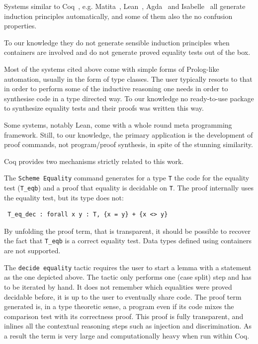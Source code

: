 \documentclass[sigplan,10pt,review]{acmart}\settopmatter{printfolios=true,printccs=false,printacmref=false}
\begin{document}
Systems similar to Coq~\cite{the_coq_development_team_2018_1219885},
e.g. Matita~\cite{10.1007/978-3-642-22438-6_7},
Lean~\cite{10.1007/978-3-319-21401-6_26}, Agda~\cite{norell:thesis} and
Isabelle~\cite{Nipkow:2002:IPA:1791547} all generate
induction principles automatically, and some of them also the
no confusion properties. 

To our knowledge they do not generate sensible induction principles
when containers are involved and do not generate proved equality tests
out of the box.

Most of the systems cited above come with simple forms of Prolog-like
automation, usually in the form of type classes. The user typically
resorts to that in order to perform some of the inductive reasoning
one needs in order to synthesise code in a type directed way.
To our knowledge no ready-to-use package to synthesize equality tests
and their proofs was written this way.

Some systems, notably Lean, come with a whole round meta programming 
framework. Still, to our knowledge, the primary application is the
development of proof commands, not program/proof synthesis, in spite
of the stunning similarity.

Coq provides two mechanisms strictly related to this work.

The \lstinline+Scheme Equality+ command generates for a type
\lstinline+T+ the code for the equality test (\lstinline+T_eqb+) 
and a proof that equality is decidable on \lstinline+T+. The proof
internally uses the equality test, but its type does not:

\begin{minipage}{\textwidth}\begin{lstlisting}
 T_eq_dec : forall x y : T, {x = y} + {x <> y}
\end{lstlisting}\end{minipage}

\noindent
By unfolding the proof term, that is transparent, it should be
possible to recover the fact that \lstinline+T_eqb+ is a correct
equality test. Data types defined using containers are not supported.

The \lstinline+decide equality+ tactic requires the user to start
a lemma with a statement as the one depicted above.
The tactic only performs one (case split) step and has to
be iterated by hand. It does not remember which equalities were
proved decidable before, it is up to the user to eventually share code.
The proof term generated is, in a type theoretic sense, a program
even if its code mixes the comparison test with its correctness proof.
This proof is fully transparent, and inlines all the contextual
reasoning steps such as injection and discrimination. As a result the
term is very large and computationally heavy when run within Coq.
\end{document}
